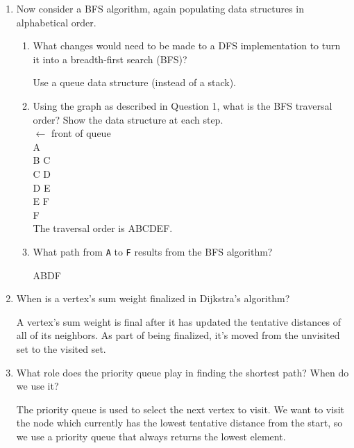 \documentclass[11pt]{article}
\newenvironment{answer}{\large\lstset{basicstyle=\tiny\ttfamily}\color{white} }{}
\newenvironment{answer}{\large\lstset{basicstyle=\large\ttfamily}\color{red} }{}
\begin{document}
\begin{enumerate}
\begin{enumerate}
\end{enumerate}


\item Now consider a BFS algorithm, again populating data structures in alphabetical order.
\begin{enumerate}
\item
What changes would need to be made to a DFS implementation to turn it into a breadth-first search (BFS)?

\begin{answer}
Use a queue data structure (instead of a stack).
\end{answer}

\item
Using the graph as described in Question 1, what is the BFS traversal order?
Show the data structure at each step. \\
\begin{answer}
$\leftarrow$ front of queue \\
A \\
B C \\
C D \\
D E \\
E F \\
F \\

The traversal order is ABCDEF.
\end{answer}

\item
What path from \texttt{A} to \texttt{F} results from the BFS algorithm?

\begin{answer}
ABDF
\end{answer}

\end{enumerate}


\item When is a vertex's sum weight finalized in Dijkstra's algorithm?

    \begin{answer}
    A vertex's sum weight is final after it has updated the tentative distances
    of all of its neighbors. As part of being finalized, it's moved from the
    unvisited set to the visited set.
    \end{answer}


\item What role does the priority queue play in finding the shortest path?
      When do we use it?

    \begin{answer}
    The priority queue is used to select the next vertex to visit. We want to
    visit the node which currently has the lowest tentative distance from the
    start, so we use a priority queue that always returns the lowest element.
    \end{answer}



\end{enumerate}
\end{document}
